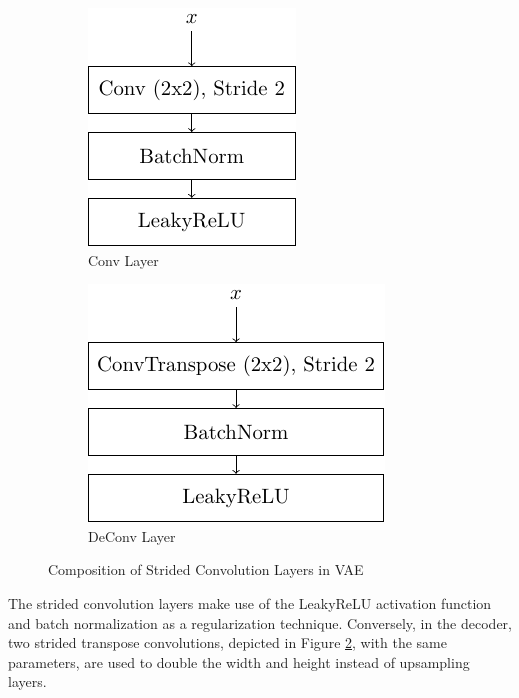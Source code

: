 \begin{figure}[htb]
    \centering
    \begin{subfigure}[b]{0.45\textwidth}
        \centering
        \includegraphics[]{figures/model_architecture/build/conv_layer.pdf}
        \caption{Conv Layer}
        \label{fig:conv_layer}
    \end{subfigure}
    \hfill
    \begin{subfigure}[b]{0.45\textwidth}
        \centering
        \includegraphics[]{figures/model_architecture/build/deconv_layer.pdf}
        \caption{DeConv Layer}
        \label{fig:deconv_layer}
    \end{subfigure}
    \caption{Composition of Strided Convolution Layers in VAE}
    \label{fig:strided_convolutions}
\end{figure}

The strided convolution layers make use of the LeakyReLU activation function and batch normalization \parencite{BatchNorm} as a regularization technique.
Conversely, in the decoder, two strided transpose convolutions, depicted in Figure \ref{fig:deconv_layer}, with the same parameters, are used to double the width and height instead of upsampling layers.

